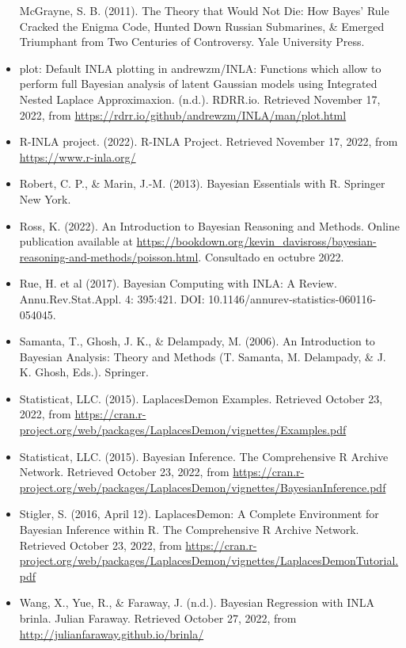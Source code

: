 \documentclass[
]{book}
\begin{document}
\begin{itemize}
  McGrayne, S. B. (2011). The Theory that Would Not Die: How Bayes' Rule Cracked the Enigma Code, Hunted Down Russian Submarines, \& Emerged Triumphant from Two Centuries of Controversy. Yale University Press.
\item
  plot: Default INLA plotting in andrewzm/INLA: Functions which allow to perform full Bayesian analysis of latent Gaussian models using Integrated Nested Laplace Approximaxion. (n.d.). RDRR.io. Retrieved November 17, 2022, from \url{https://rdrr.io/github/andrewzm/INLA/man/plot.html}
\item
  R-INLA project. (2022). R-INLA Project. Retrieved November 17, 2022, from \url{https://www.r-inla.org/}
\item
  Robert, C. P., \& Marin, J.-M. (2013). Bayesian Essentials with R. Springer New York.
\item
  Ross, K. (2022). An Introduction to Bayesian Reasoning and Methods. Online publication available at \url{https://bookdown.org/kevin_davisross/bayesian-reasoning-and-methods/poisson.html}. Consultado en octubre 2022.
\item
  Rue, H. et al (2017). Bayesian Computing with INLA: A Review. Annu.Rev.Stat.Appl. 4: 395:421. DOI: 10.1146/annurev-statistics-060116-054045.
\item
  Samanta, T., Ghosh, J. K., \& Delampady, M. (2006). An Introduction to Bayesian Analysis: Theory and Methods (T. Samanta, M. Delampady, \& J. K. Ghosh, Eds.). Springer.
\item
  Statisticat, LLC. (2015). LaplacesDemon Examples. Retrieved October 23, 2022, from \url{https://cran.r-project.org/web/packages/LaplacesDemon/vignettes/Examples.pdf}
\item
  Statisticat, LLC. (2015). Bayesian Inference. The Comprehensive R Archive Network. Retrieved October 23, 2022, from \url{https://cran.r-project.org/web/packages/LaplacesDemon/vignettes/BayesianInference.pdf}
\item
  Stigler, S. (2016, April 12). LaplacesDemon: A Complete Environment for Bayesian Inference within R. The Comprehensive R Archive Network. Retrieved October 23, 2022, from \url{https://cran.r-project.org/web/packages/LaplacesDemon/vignettes/LaplacesDemonTutorial.pdf}
\item
  Wang, X., Yue, R., \& Faraway, J. (n.d.). Bayesian Regression with INLA \textbar{} brinla. Julian Faraway. Retrieved October 27, 2022, from \url{http://julianfaraway.github.io/brinla/}
\end{itemize}

  
\end{document}
